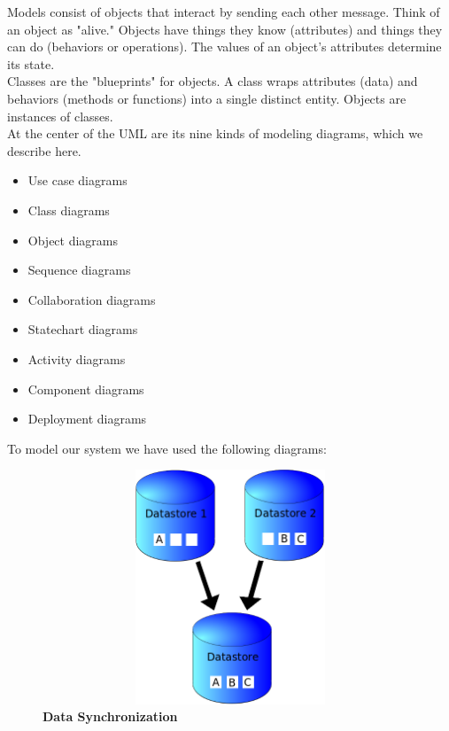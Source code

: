 \hspace*{0.82cm}Models consist of objects that interact by sending each other message. Think of an
object as "alive." Objects have things they know (attributes) and things they can do
(behaviors or operations). The values of an object's attributes determine its state.\\[0.5cm]
\hspace*{0.82cm}Classes are the "blueprints" for objects. A class wraps attributes (data) and behaviors
(methods or functions) into a single distinct entity. Objects are instances of classes.\\[0.5cm]
At the center of the UML are its nine kinds of modeling diagrams, which we describe here.
\begin{itemize}
 \item Use case diagrams
 \item Class diagrams
 \item Object diagrams
 \item Sequence diagrams
 \item Collaboration diagrams
 \item Statechart diagrams
 \item Activity diagrams
 \item Component diagrams
 \item Deployment diagrams
\end{itemize}
To model our system we have used the following diagrams:\\

\begin{figure}[H]
  \centering
    \includegraphics[height= 7cm, width=15cm]{project/images/data-sync}
  \caption{\textbf{Data Synchronization}}
\end{figure}

